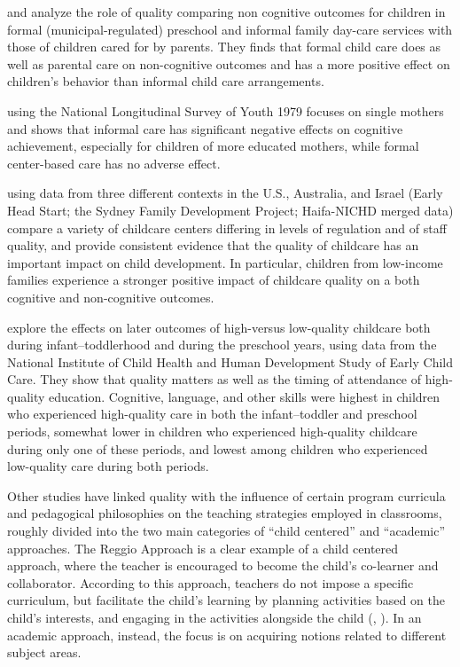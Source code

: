 \documentclass[12pt]{article}
\begin{document}
\cite{DattaGupta2010} and \cite{Bernal2011} analyze the role of quality comparing non cognitive outcomes for children in formal (municipal-regulated) preschool and informal family day-care services with those of children cared for by parents. They finds that formal child care does as well as parental care on non-cognitive outcomes and has a more positive effect on children's behavior than informal child care arrangements.

\cite{Bernal2011} using the National Longitudinal Survey of Youth 1979 focuses on single mothers and shows that informal care has significant negative effects on cognitive achievement, especially for children of more educated mothers, while formal center-based care has no adverse effect.

\cite{Love2003} using data from three different contexts in the U.S., Australia, and Israel (Early Head Start; the Sydney Family Development Project; Haifa-NICHD merged data) compare a variety of childcare centers differing in levels of regulation and of staff quality, and provide consistent evidence that the quality of childcare has an important impact on child development. In particular, children from low-income families experience a stronger positive impact of childcare quality on a both cognitive and non-cognitive outcomes.

\cite{Li2013} explore the effects on later outcomes of high-versus low-quality childcare both during infant--toddlerhood and during the preschool years, using data from the National Institute of Child Health and Human Development Study of Early Child Care. They show that quality matters as well as the timing of attendance of high-quality education. Cognitive, language, and other skills were highest in children who experienced high-quality care in both the infant--toddler and preschool periods, somewhat lower in children who experienced high-quality childcare during only one of these periods, and lowest among children who experienced low-quality care during both periods.

Other studies have linked quality with the influence of certain program curricula and pedagogical philosophies on the teaching strategies employed in classrooms, roughly divided into the two main categories of ``child centered'' and ``academic'' approaches. The Reggio Approach is a clear example of a child centered approach, where the teacher is encouraged to become the child's co-learner and collaborator. According to this approach, teachers do not impose a specific curriculum, but facilitate the child's learning by planning activities based on the child's interests, and engaging in the activities alongside the child (\cite{Malaguzzi1993}, \cite{Hewett2001}). In an academic approach, instead, the focus is on acquiring notions related to different subject areas.
\end{document}
